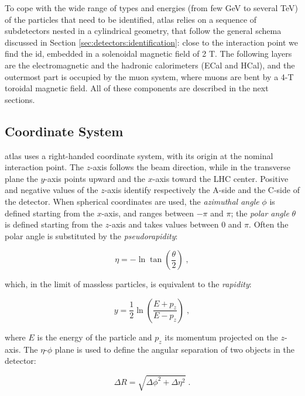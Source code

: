 To cope with the wide range of types and energies (from few GeV to several TeV) of the particles that need to be identified, \gls{atlas} relies on a sequence of subdetectors nested in a cylindrical geometry, that follow the general schema discussed in Section \ref{sec:detectors:identification}: close to the interaction point we find the \gls{id}, embedded in a solenoidal magnetic field of 2 T. The following layers are the electromagnetic and the hadronic calorimeters (ECal and HCal), and the outermost part is occupied by the muon system, where muons are bent by a 4-T toroidal magnetic field. All of these components are described in the next sections.

\subsection{Coordinate System}

\gls{atlas} uses a right-handed coordinate system, with its origin at the nominal interaction point. The $z$-axis follows the beam direction, while in the transverse plane the $y$-axis points upward and the $x$-axis toward the LHC center. Positive and negative values of the $z$-axis identify respectively the A-side and the C-side of the detector. When spherical coordinates are used, the \textit{azimuthal angle} $\phi$ is defined starting from the $x$-axis, and ranges between $-\pi$ and $\pi$; the \textit{polar angle} $\theta$ is defined starting from the $z$-axis and takes values between $0$ and $\pi$. Often the polar angle is substituted by the \textit{pseudorapidity}: 
 
\begin{equation}
\label{eq:cern:eta}
\eta = - \ln\tan\left(\frac{\theta}{2}\right) \; ,
\end{equation}

which, in the limit of massless particles, is equivalent to the \textit{rapidity}:

\begin{equation}
\label{eq:cern:y}
y = \frac{1}{2} \ln\left(\frac{E + p_z}{E - p_z}\right) \; ,
\end{equation}

where $E$ is the energy of the particle and $p_z$ its momentum projected on the $z$-axis. The $\eta$-$\phi$ plane is used to define the angular separation of two objects in the detector:

\begin{equation}
\label{eq:cern:dR}
\Delta R = \sqrt{ \Delta \phi^2 + \Delta \eta^2  } \; .
\end{equation}

